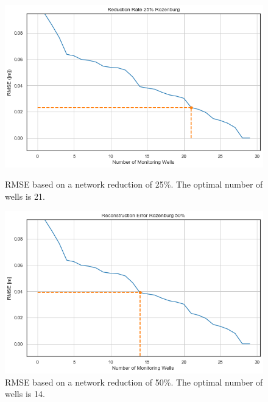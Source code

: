     \begin{figure}[htbp]
    \begin{minipage}{0.48\textwidth}
        \centering %
        \includegraphics[width=\linewidth]{figures/res roz/25roz.png}
        \caption{RMSE based on a network reduction of 25\%. The optimal number of wells is 21.}
        \label{roz25}
    \end{minipage}
    \begin{minipage}{0.48\textwidth}
        \centering %
        \includegraphics[width=\linewidth]{figures/res roz/50roz.png}
        \caption{RMSE based on a network reduction of 50\%. The optimal number of wells is 14.}
        \label{roz50}
    \end{minipage}
\end{figure}

